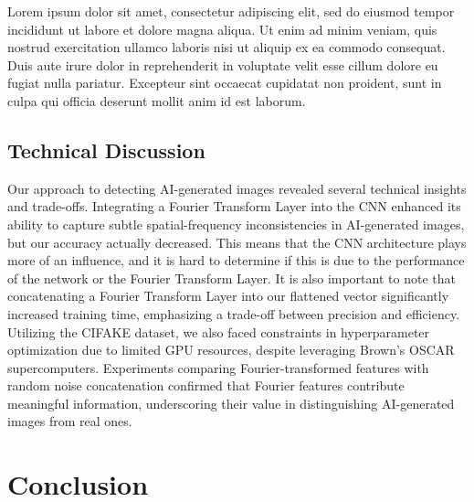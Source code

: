Lorem ipsum dolor sit amet, consectetur adipiscing elit, sed do eiusmod tempor incididunt ut labore et dolore magna aliqua. Ut enim ad minim veniam, quis nostrud exercitation ullamco laboris nisi ut aliquip ex ea commodo consequat. Duis aute irure dolor in reprehenderit in voluptate velit esse cillum dolore eu fugiat nulla pariatur. Excepteur sint occaecat cupidatat non proident, sunt in culpa qui officia deserunt mollit anim id est laborum.

\subsection{Technical Discussion}

Our approach to detecting AI-generated images revealed several technical insights and trade-offs. Integrating a Fourier Transform Layer into the CNN enhanced its ability to capture subtle spatial-frequency inconsistencies in AI-generated images, but our accuracy actually decreased. This means that the CNN architecture plays more of an influence, and it is hard to determine if this is due to the performance of the network or the Fourier Transform Layer. It is also important to note that concatenating a Fourier Transform Layer into our flattened vector significantly increased training time, emphasizing a trade-off between precision and efficiency. Utilizing the CIFAKE dataset, we also faced constraints in hyperparameter optimization due to limited GPU resources, despite leveraging Brown’s OSCAR supercomputers. Experiments comparing Fourier-transformed features with random noise concatenation confirmed that Fourier features contribute meaningful information, underscoring their value in distinguishing AI-generated images from real ones.



\section{Conclusion}

